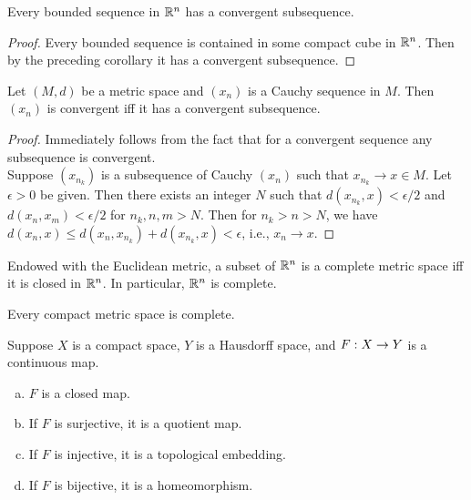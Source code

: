 \documentclass[11pt,a4paper]{article}
\begin{document}
\begin{proposition}
Every bounded sequence in $\mathbb{R}^n$ has a convergent subsequence.
\end{proposition}

\begin{proof}
Every bounded sequence is contained in some compact cube in $\mathbb{R}^n$. Then by the preceding corollary it has a convergent subsequence.
\end{proof}

\begin{proposition}
Let $(M,d)$ be a metric space and $(x_n)$ is a Cauchy sequence in $M$. Then $(x_n)$ is convergent iff it has a convergent subsequence.
\end{proposition}

\begin{proof}
\forward Immediately follows from the fact that for a convergent sequence any subsequence is convergent.
\\
\converse Suppose $(x_{n_k})$ is a subsequence of Cauchy $(x_n)$ such that $x_{n_k}\rightarrow x\in M$. Let $\epsilon>0$ be given. Then there exists an integer $N$ such that $d(x_{n_k},x)<\epsilon/2$ and $d(x_n,x_m)<\epsilon/2$ for $n_k,n,m>N$. Then for $n_k>n>N$, we have $d(x_{n},x)\le d(x_n,x_{n_k})+d(x_{n_k},x)<\epsilon$, i.e., $x_n\rightarrow x$.
\end{proof}

\begin{proposition}
Endowed with the Euclidean metric, a subset of $\mathbb{R}^n$ is a complete metric space iff it is closed in $\mathbb{R}^n$. In particular, $\mathbb{R}^n$ is complete.
\end{proposition}

\begin{proposition}
Every compact metric space is complete.
\end{proposition}

\begin{proposition}
Suppose $X$ is a compact space, $Y$ is a Hausdorff space, and $F:X\rightarrow Y$ is a continuous map.
\begin{enumerate}[(a)]
    \item $F$ is a closed map.
    \item If $F$ is surjective, it is a quotient map.
    \item If $F$ is injective, it is a topological embedding.
    \item If $F$ is bijective, it is a homeomorphism.
\end{enumerate}
\end{proposition}
\end{document}
